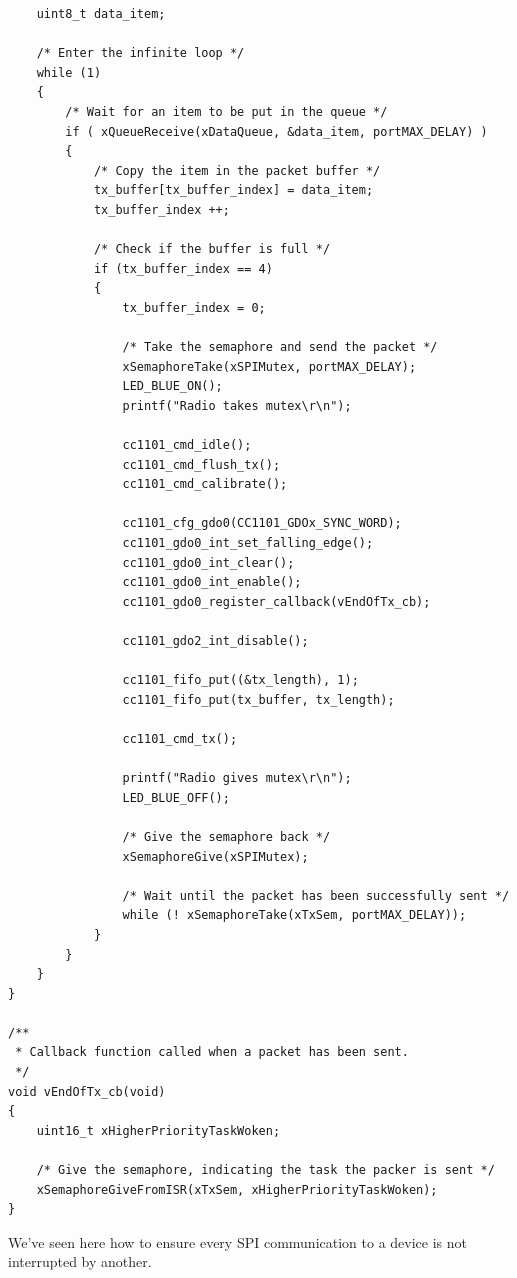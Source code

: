 \documentclass[11pt]{report}
\begin{document}
\begin{verbatim}
    uint8_t data_item;

    /* Enter the infinite loop */
    while (1)
    {
        /* Wait for an item to be put in the queue */
        if ( xQueueReceive(xDataQueue, &data_item, portMAX_DELAY) )
        {
            /* Copy the item in the packet buffer */
            tx_buffer[tx_buffer_index] = data_item;
            tx_buffer_index ++;

            /* Check if the buffer is full */
            if (tx_buffer_index == 4)
            {
                tx_buffer_index = 0;

                /* Take the semaphore and send the packet */
                xSemaphoreTake(xSPIMutex, portMAX_DELAY);
                LED_BLUE_ON();
                printf("Radio takes mutex\r\n");

                cc1101_cmd_idle();
                cc1101_cmd_flush_tx();
                cc1101_cmd_calibrate();

                cc1101_cfg_gdo0(CC1101_GDOx_SYNC_WORD);
                cc1101_gdo0_int_set_falling_edge();
                cc1101_gdo0_int_clear();
                cc1101_gdo0_int_enable();
                cc1101_gdo0_register_callback(vEndOfTx_cb);

                cc1101_gdo2_int_disable();

                cc1101_fifo_put((&tx_length), 1);
                cc1101_fifo_put(tx_buffer, tx_length);

                cc1101_cmd_tx();

                printf("Radio gives mutex\r\n");
                LED_BLUE_OFF();

                /* Give the semaphore back */
                xSemaphoreGive(xSPIMutex);

                /* Wait until the packet has been successfully sent */
                while (! xSemaphoreTake(xTxSem, portMAX_DELAY));
            }
        }
    }
}

/**
 * Callback function called when a packet has been sent.
 */
void vEndOfTx_cb(void)
{
    uint16_t xHigherPriorityTaskWoken;

    /* Give the semaphore, indicating the task the packer is sent */
    xSemaphoreGiveFromISR(xTxSem, xHigherPriorityTaskWoken);
}

\end{verbatim}

We've seen here how to ensure every SPI communication to a device is not interrupted by another.
\end{document}
